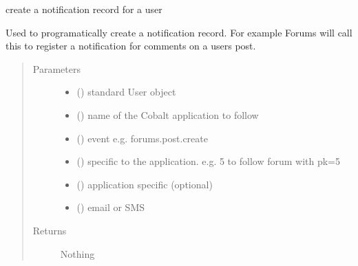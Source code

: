 \documentclass[letterpaper,10pt,english]{sphinxmanual}
\begin{document}

\begin{fulllineitems}
\label{\detokenize{notifications:notifications.views.create_user_notification}}
create a notification record for a user

Used to programatically create a notification record. For example Forums
will call this to register a notification for comments on a users post.
\begin{quote}\begin{description}
\item[{Parameters}] \leavevmode\begin{itemize}
\item {} 
 ({\hyperref[\detokenize{accounts:accounts.models.User}]{}}) \textendash{} standard User object

\item {} 
 () \textendash{} name of the Cobalt application to follow

\item {} 
 () \textendash{} event e.g. forums.post.create

\item {} 
 () \textendash{} specific to the application. e.g. 5 to follow forum with pk=5

\item {} 
 () \textendash{} application specific (optional)

\item {} 
 () \textendash{} email or SMS

\end{itemize}

\item[{Returns}] \leavevmode
Nothing

\end{description}\end{quote}

\end{fulllineitems}
\end{document}
